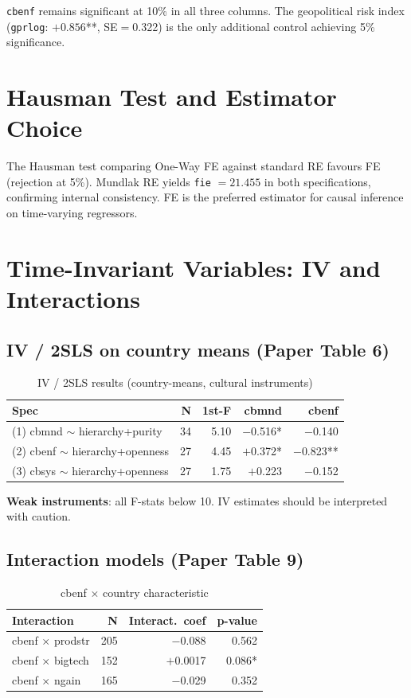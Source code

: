 \documentclass[12pt,a4paper]{article}
\begin{document}
\noindent \texttt{cbenf} remains significant at 10\% in all three columns.
The geopolitical risk index (\texttt{gprlog}: $+0.856$**, SE$=$0.322) is the
only additional control achieving 5\% significance.

\section{Hausman Test and Estimator Choice}

The Hausman test comparing One-Way FE against standard RE favours FE
(rejection at 5\%). Mundlak RE yields \texttt{fie} $=21.455$ in both
specifications, confirming internal consistency. FE is the preferred
estimator for causal inference on time-varying regressors.

\section{Time-Invariant Variables: IV and Interactions}

\subsection{IV / 2SLS on country means (Paper Table 6)}

\begin{table}[H]
\centering
\caption{IV / 2SLS results (country-means, cultural instruments)}
\label{tab:iv}
\begin{tabular}{lrrrr}
\toprule
Spec & N & 1st-F & cbmnd & cbenf \\
\midrule
(1) cbmnd $\sim$ hierarchy+purity   & 34 & 5.10 & $-$0.516* & $-$0.140 \\
(2) cbenf $\sim$ hierarchy+openness & 27 & 4.45 & $+$0.372* & $-$0.823** \\
(3) cbsys $\sim$ hierarchy+openness & 27 & 1.75 & $+$0.223  & $-$0.152 \\
\bottomrule
\end{tabular}
\end{table}

\noindent\textbf{Weak instruments}: all F-stats below 10.
IV estimates should be interpreted with caution.

\subsection{Interaction models (Paper Table 9)}

\begin{table}[H]
\centering
\caption{cbenf $\times$ country characteristic}
\label{tab:interact}
\begin{tabular}{lrrr}
\toprule
Interaction & N & Interact.\ coef & p-value \\
\midrule
cbenf $\times$ prodstr & 205 & $-$0.088 & 0.562 \\
cbenf $\times$ bigtech & 152 & $+$0.0017 & 0.086* \\
cbenf $\times$ ngain   & 165 & $-$0.029 & 0.352 \\
\bottomrule
\end{tabular}
\end{table}
\end{document}
